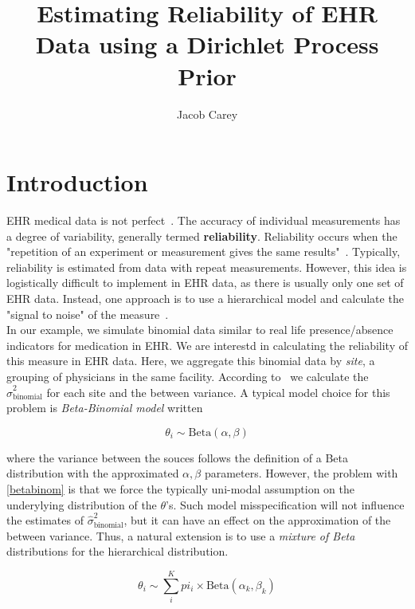 \documentclass{article}
\begin{document}
\title{Estimating Reliability of EHR Data using a Dirichlet Process Prior}
\author{Jacob Carey}

\maketitle

\section{Introduction}

EHR medical data is not perfect~\cite{kanger2014}. The accuracy of individual measurements has a degree of variability, generally termed \textbf{reliability}. Reliability occurs when the "repetition of an experiment or measurement gives the same results"~\cite{porta2008}.  Typically, reliability is estimated from data with repeat measurements. However, this idea is logistically difficult to implement in EHR data, as there is usually only one set of EHR data. Instead, one approach is to use a hierarchical model and calculate the "signal to noise" of the measure~\cite{Adams2009}. \\

In our example, we simulate binomial data similar to real life presence/absence indicators for medication in EHR. We are interestd in calculating the reliability of this measure in EHR data. Here, we aggregate this binomial data by \textit{site}, a grouping of physicians in the same facility. According to~\cite{Adams2009} we calculate the $\hat{\sigma}^2_{\text{binomial}}$ for each site and the between variance. A typical model choice for this problem is \textit{Beta-Binomial model} written

\begin{equation}\label{betabinom}
\theta_i \sim \text{Beta}(\alpha, \beta)
\end{equation}

where the variance between the souces follows the definition of a Beta distribution with the approximated $\alpha, \beta$ parameters. However, the problem with \eqref{betabinom} is that we force the typically uni-modal assumption on the underylying distribution of the $\theta$'s. Such model misspecification will not influence the estimates of $\hat{\sigma}^2_{\text{binomial}}$, but it can have an effect on the approximation of the between variance. Thus, a natural extension is to use a \textit{mixture of Beta} distributions for the hierarchical distribution.

\begin{equation}\label{eq:finitemix-betabinom}
\theta_i \sim \sum_i^K pi_i \times \text{Beta}(\alpha_k, \beta_k)
\end{equation}
\end{document}
